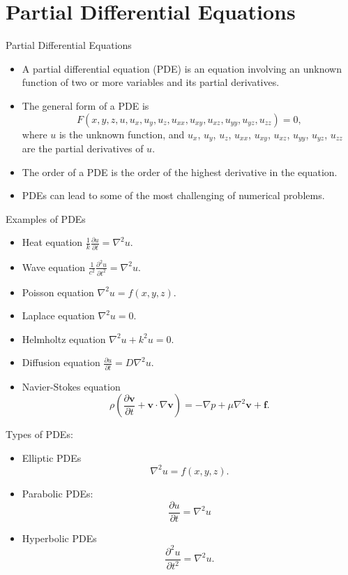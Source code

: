 \documentclass{beamer}
\begin{document}
\section{Partial Differential Equations}
\begin{frame}{Partial Differential Equations}
\begin{itemize}
    \item A partial differential equation (PDE) is an equation involving an unknown function of two or more variables and its partial derivatives.
    \item The general form of a PDE is
     \[
     F(x, y, z, u, u_x, u_y, u_z, u_{xx}, u_{xy}, u_{xz}, u_{yy}, u_{yz}, u_{zz}) = 0,
     \]
     where $u$ is the unknown function, and $u_x$, $u_y$, $u_z$, $u_{xx}$, $u_{xy}$, $u_{xz}$, $u_{yy}$, $u_{yz}$, $u_{zz}$ are the partial derivatives of $u$.
\item The order of a PDE is the order of the highest derivative in the equation.
\item PDEs can
lead to some of the most challenging of numerical problems. 

\end{itemize}
\end{frame}
\begin{frame}{Examples of PDEs}
    \begin{itemize}
            \item Heat equation $\frac{1}{k} \frac{\partial u}{\partial t}=\nabla^2 u$.
            \item Wave equation $\frac{1}{c^2} \frac{\partial^2 u}{\partial t^2}=\nabla^2 u$.

            \item Poisson equation $\nabla^2 u = f(x, y, z)$.
            \item Laplace equation $\nabla^2 u = 0$.
            \item Helmholtz equation $\nabla^2 u + k^2 u = 0$.
            \item Diffusion equation $\frac{\partial u}{\partial t} = D \nabla^2 u$.
            \item Navier-Stokes equation 
            \[
            \rho \left(\frac{\partial \mathbf{v}}{\partial t} + \mathbf{v} \cdot \nabla
             \mathbf{v}\right) = -\nabla p + \mu \nabla^2 \mathbf{v} + \mathbf{f}.
            \]
        \end{itemize}
\end{frame}
\begin{frame}{Types of PDEs:}

    \begin{itemize}
        \item Elliptic PDEs
        \[\nabla^2 u = f(x, y, z).
        \]
        
        \item Parabolic PDEs: 
        \[\frac{\partial u}{\partial t} = \nabla^2 u\]
        \item Hyperbolic PDEs\[\frac{\partial^2 u}{\partial t^2} = \nabla^2 u.\]
    \end{itemize}

\end{frame}
\end{document}
